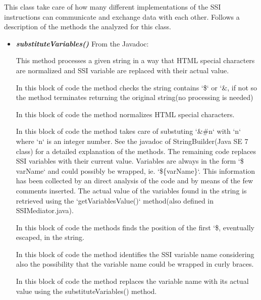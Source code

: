 \documentclass[11pt,titlepage]{article} %
\begin{document}
  This class take care of
  how many different implementations of the SSI instructions can communicate and exchange data with each other.\newline
  Follows a description of the methods the analyzed for this class.
  \begin{itemize}
   \item \textbf{\textit{substituteVariables()}}
    From the Javadoc:
    
    This method processes a given string in a way that HTML special characters are normalized and SSI variable are replaced with their
    actual value.
    
    In this block of code the method checks the string contains `\$` or `\&, if not so the method terminates returning the original string(no processing  is needed)
    
    
    In this block of code the method normalizes HTML special characters.
    
    
  
    In this block of code the method takes care of substuting `\&\#n` with `n` where `n` is an integer number.
    See the javadoc of StringBuilder(Java SE 7 class) for a detailed explanation of the methods.\newline
    The remaining code replaces SSI variables with their current value.\newline
    Variables are always in the form `\$ varName` and could possibly be wrapped, ie. `\$\{varName\}`. 
    This information has been collected by an direct analysis of the code and by means of the few comments inserted. 
    The actual value of the variables found in the string is retrieved using the `getVariablesValue()` method(also defined in SSIMediator.java).\newline
    
    
    In this block of code the methods finds the position of the first `\$, eventually escaped, in the string.\newline
    
        
    In this block of code the method identifies the SSI variable name 
    considering also the possibility that the variable name could be wrapped in curly braces.
    
    
    In this block of code the method replaces the variable name with its actual value using the substituteVariables() method.
    

  \end{itemize}
\end{document}
